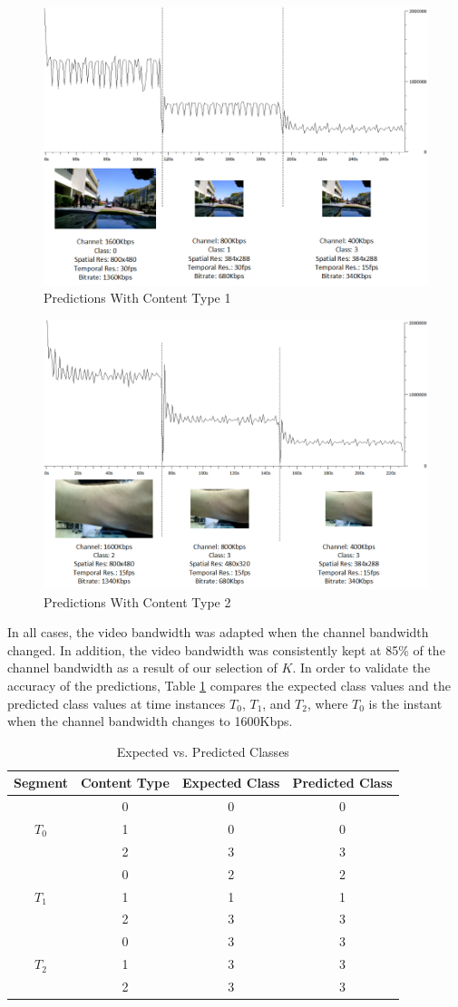 \documentclass[preprint, 12pt]{elsarticle}
\begin{document}
\begin{figure}[h]
\centering
\includegraphics[width=0.5\linewidth]{TrainingExperimentSports.png}
\caption{Predictions With Content Type 1}
\label{fig:Sports}
\end{figure}
\begin{figure}[h]
\centering
\includegraphics[width=0.5\linewidth]{TrainingExperimentMedical.png}
\caption{Predictions With Content Type 2}
\label{fig:Medical}
\end{figure}
In all cases, the video bandwidth was adapted when the channel bandwidth changed. In addition, the video bandwidth was consistently kept at 85\% of the channel bandwidth as a result of our selection of $K$. In order to validate the accuracy of the predictions, Table \ref{tab:PredictedClasses} compares the expected class values and the predicted class values at time instances $T_0$, $T_1$, and $T_2$, where $T_0$ is the instant when the channel bandwidth changes to 1600Kbps.
\begin{table} [h]
\caption{Expected vs. Predicted Classes}
\label{tab:PredictedClasses}
\begin{tabular}{c|c|c|c}
\textbf{Segment}&\textbf{Content Type}&\textbf{Expected Class}&\textbf{Predicted Class}\\
\hline
&0&0&0\\
$T_0$&1&0&0\\
&2&3&3\\
\hline
&0&2&2\\
$T_1$&1&1&1\\
&2&3&3\\
\hline
&0&3&3\\
$T_2$&1&3&3\\
&2&3&3\\
\end{tabular}
\end{table} 
\end{document}
